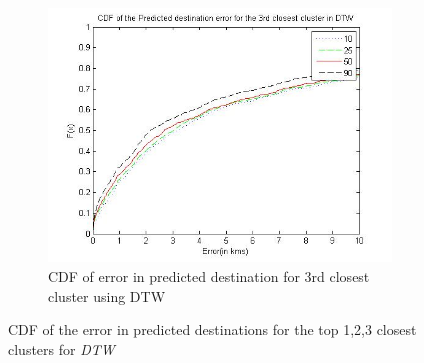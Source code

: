 \begin{figure}
\begin{subfigure}[t]{.5\textwidth}
        \includegraphics[scale=0.4]{figs/dtw_top3.jpg}
        \caption{CDF of error in predicted destination for 3rd closest cluster using DTW}
    \end{subfigure}
    \caption{CDF of the error in predicted destinations for the top 1,2,3 closest clusters for \emph{DTW}}
    \label{fig:nextloc_DTW}       
\end{figure}

